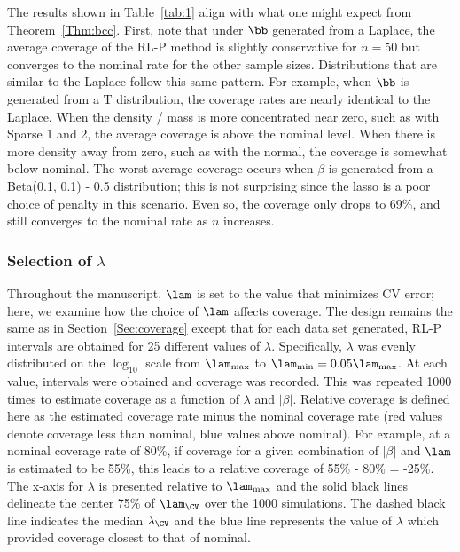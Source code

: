 The results shown in Table~\ref{tab:1} align with what one might expect from Theorem~\ref{Thm:bcc}. First, note that under $\bb$ generated from a Laplace, the average coverage of the RL-P method is slightly conservative for $n=50$ but converges to the nominal rate for the other sample sizes. Distributions that are similar to the Laplace follow this same pattern. For example, when $\bb$ is generated from a T distribution, the coverage rates are nearly identical to the Laplace. When the density / mass is more concentrated near zero, such as with Sparse 1 and 2, the average coverage is above the nominal level. When there is more density away from zero, such as with the normal, the coverage is somewhat below nominal. The worst average coverage occurs when $\beta$ is generated from a Beta(0.1, 0.1) - 0.5 distribution; this is not surprising since the lasso is a poor choice of penalty in this scenario. Even so, the coverage only drops to 69\%, and still converges to the nominal rate as $n$ increases.

\begin{table}[htb!]
  \centering
  
  \caption{\label{tab:1} Results are from the simulation described in Section~\ref{Sec:distribution}. The nominal coverage rate is 80\%.}
\end{table}

\subsubsection{Selection of \texorpdfstring{$\lambda$}{lambda}} \label{Sec:lambda}

Throughout the manuscript, $\lam$ is set to the value that minimizes CV error; here, we examine how the choice of $\lam$ affects coverage. The design remains the same as in Section~\ref{Sec:coverage} except that for each data set generated, RL-P intervals are obtained for 25 different values of $\lambda$. Specifically, $\lambda$ was evenly distributed on the $\log_{10}$ scale from $\lam_{\max}$ to $\lam_{\min} = 0.05 \lam_{\max}$. At each value, intervals were obtained and coverage was recorded. This was repeated 1000 times to estimate coverage as a function of $\lambda$ and $|\beta|$. Relative coverage is defined here as the estimated coverage rate minus the nominal coverage rate (red values denote coverage less than nominal, blue values above nominal). For example, at a nominal coverage rate of 80\%, if coverage for a given combination of $|\beta|$ and $\lam$ is estimated to be 55\%, this leads to a relative coverage of 55\% - 80\% = -25\%. The x-axis for $\lambda$ is presented relative to $\lam_{\max}$ and the solid black lines delineate the center 75\% of $\lam_{\CV}$ over the 1000 simulations. The dashed black line indicates the median $\lambda_{\CV}$ and the blue line represents the value of $\lambda$ which provided coverage closest to that of nominal.

